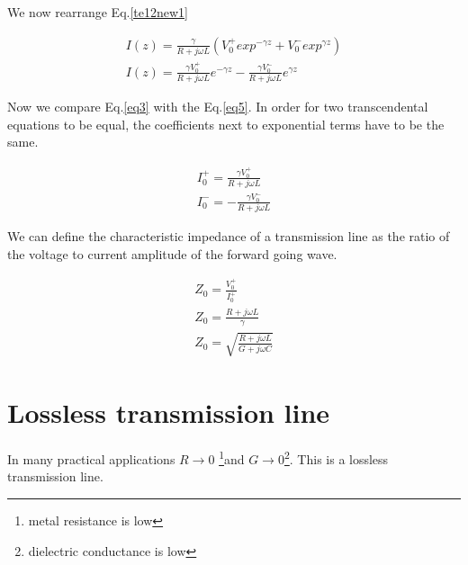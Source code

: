 \documentclass{ximera}
\begin{document}
We now rearrange Eq.\ref{te12new1}

\begin{eqnarray}
I(z)=\frac{\gamma}{R+j\omega L} ( V_0^+ exp^{-\gamma z} + V_0^-
 exp^{\gamma z})  \nonumber  \\
I(z)=\frac{\gamma V_0^+}{R+ j \omega L} e^{-\gamma z} - \frac{\gamma V_0^-}{R+ j \omega L} e^{\gamma z} \label{eq3}
\end{eqnarray}

Now we compare Eq.\ref{eq3} with the Eq.\ref{eq5}. In order for two transcendental equations to be equal, the coefficients next to exponential terms have to be the same.

\begin{eqnarray}
I_0^+=\frac{\gamma V_0^+}{R+ j \omega L} \nonumber  \\
I_0^-= - \frac{\gamma V_0^-}{R+ j \omega L} \nonumber
\end{eqnarray}

We can define the characteristic impedance of a transmission line as
the ratio of the voltage to current amplitude of the forward going
wave.


\begin{eqnarray}
Z_0=\frac{V_0^+}{ I_0^+} \nonumber   \\ \nonumber
Z_0=\frac{R+j\omega L}{\gamma} \nonumber   \\ \nonumber
Z_0=\sqrt{\frac{R+j\omega L}{G+ j\omega C}}
\end{eqnarray}


\section{Lossless transmission line}


In many practical applications $R\to 0$ \footnote{metal resistance is
low}and $G \to 0$\footnote{dielectric conductance is low}. This is a
lossless transmission line.
\end{document}
